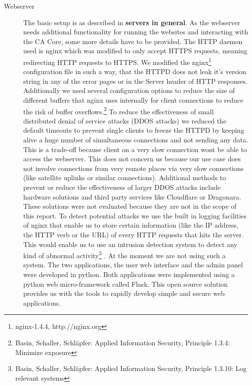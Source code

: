 \documentclass[a4paper, toc=index, 12pt, DIV14, twoside, BCOR2cm, headsepline, numbers=noenddot, bibliography=totoc]{report}
\begin{document}
\begin{description}
\item[Webserver ] The basic setup is as described in {\bfseries servers in general}. As the webserver needs additional functionality for running the websites and interacting with the CA Core, some more details have to be provided.\newline
The HTTP daemon used is nginx which was modified to only accept HTTPS requests, meaning redirecting HTTP requests to HTTPS.\newline
We modified the nginx\footnote{nginx-1.4.4, http://nginx.org} configuration file in such a way, that the HTTPD does not leak it's version string in any of the error pages or in the Server header of HTTP responses. Additionally we used several configuration options to reduce the size of different buffers that nginx uses internally for client connections to reduce the risk of buffer overflows.\footnote{Basin, Schaller, Schläpfer: Applied Information Security, Principle 1.3.4: Minimize exposure}
\newline
To reduce the effectiveness of small distributed denial of service attacks (DDOS attacks) we reduced the default timeouts to prevent single clients to freeze the HTTPD by keeping alive a huge number of simultaneous connections and not sending any data. This is a trade-off because client on a very slow connection wont be able to access the webserver. This does not concern us because our use case does not involve connections from very remote places via very slow connections (like satellite uplinks or similar connections). Additional methods to prevent or reduce the effectiveness of larger DDOS attacks include hardware solutions and third party services like Cloudflare or Dragonara. These solutions were not evaluated because they are not in the scope of this report.\newline
To detect potential attacks we use the built in logging facilities of nginx that enable us to store certain information (like the IP address, the HTTP verb or the URL) of every HTTP requests that hits the server. This would enable us to use an intrusion detection system to detect any kind of abnormal activity\footnote{Basin, Schaller, Schläpfer: Applied Information Security, Principle 1.3.10: Log relevant systems}
. At the moment we are not using such a system.\newline
The two applications, the user web interface and the admin panel were developed in python. Both applications were implemented using a python web micro-framework called Flask. This open source solution provides us with the tools to rapidly develop simple and secure web applications.\newline

\end{description}
\end{document}

